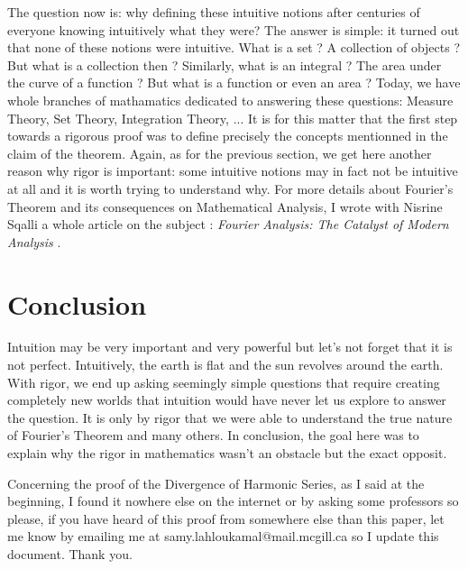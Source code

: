 \documentclass[10pt]{article}
\theoremstyle{definition}
\begin{document}
The question now is: why defining these intuitive notions after centuries of everyone knowing intuitively what they were? The answer is simple: it turned out that none of these notions were intuitive. What is a set ? A collection of objects ? But what is a collection then ? Similarly, what is an integral ? The area under the curve of a function ? But what is a function or even an area ? Today, we have whole branches of mathamatics dedicated to answering these questions: Measure Theory, Set Theory, Integration Theory, ... It is for this matter that the first step towards a rigorous proof was to define precisely the concepts mentionned in the claim of the theorem. Again, as for the previous section, we get here another reason why rigor is important: some intuitive notions may in fact not be intuitive at all and it is worth trying to understand why. For more details about Fourier's Theorem and its consequences on Mathematical Analysis, I wrote with Nisrine Sqalli a whole article on the subject : \textit{Fourier Analysis: The Catalyst of Modern Analysis} \cite{fourier}.

\section{Conclusion}

Intuition may be very important and very powerful but let's not forget that it is not perfect. Intuitively, the earth is flat and the sun revolves around the earth. With rigor, we end up asking seemingly simple questions that require creating completely new worlds that intuition would have never let us explore to answer the question. It is only by rigor that we were able to understand the true nature of Fourier's Theorem and many others. In conclusion, the goal here was to explain why the rigor in mathematics wasn't an obstacle but the exact opposit.

Concerning the proof of the Divergence of Harmonic Series, as I said at the beginning, I found it nowhere else on the internet or by asking some professors so please, if you have heard of this proof from somewhere else than this paper, let me know by emailing me at samy.lahloukamal@mail.mcgill.ca so I update this document. Thank you.

\newpage


\end{document}
